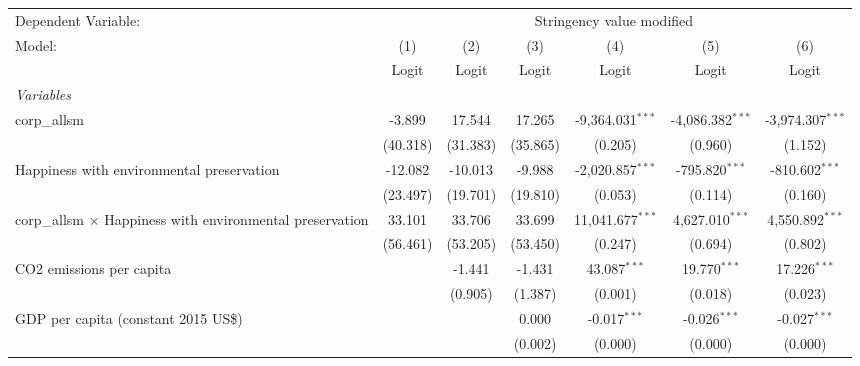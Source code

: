 
\begingroup
\centering
\begin{tabular}{lcccccc}
   \toprule
   Dependent Variable: & \multicolumn{6}{c}{Stringency value modified}\\
   Model:                                                           & (1)      & (2)      & (3)      & (4)                & (5)                & (6)\\  
                                                                    &  Logit   & Logit    & Logit    & Logit              & Logit              & Logit\\  
   \midrule
   \emph{Variables}\\
   corp\_allsm                                                      & -3.899   & 17.544   & 17.265   & -9,364.031$^{***}$ & -4,086.382$^{***}$ & -3,974.307$^{***}$\\   
                                                                    & (40.318) & (31.383) & (35.865) & (0.205)            & (0.960)            & (1.152)\\   
   Happiness with environmental preservation                        & -12.082  & -10.013  & -9.988   & -2,020.857$^{***}$ & -795.820$^{***}$   & -810.602$^{***}$\\   
                                                                    & (23.497) & (19.701) & (19.810) & (0.053)            & (0.114)            & (0.160)\\   
   corp\_allsm $\times$ Happiness with environmental preservation   & 33.101   & 33.706   & 33.699   & 11,041.677$^{***}$ & 4,627.010$^{***}$  & 4,550.892$^{***}$\\   
                                                                    & (56.461) & (53.205) & (53.450) & (0.247)            & (0.694)            & (0.802)\\   
   CO2 emissions per capita                                         &          & -1.441   & -1.431   & 43.087$^{***}$     & 19.770$^{***}$     & 17.226$^{***}$\\   
                                                                    &          & (0.905)  & (1.387)  & (0.001)            & (0.018)            & (0.023)\\   
   GDP per capita (constant 2015 US\$)                              &          &          & 0.000    & -0.017$^{***}$     & -0.026$^{***}$     & -0.027$^{***}$\\   
                                                                    &          &          & (0.002)  & (0.000)            & (0.000)            & (0.000)\\   

\end{tabular}
